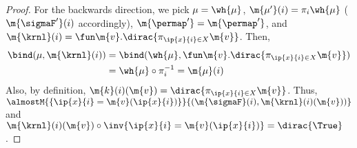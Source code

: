 \begin{proof}
	For the backwards direction,
	we pick $\mu = \wh{\mu}$,
  $\m{\mu'}(i) = \pi_{i}\wh{\mu}$ ($\m{\sigmaF'}(i)$ accordingly),
  $\m{\permap'}=\m{\permap'}$,
	and $\m{\krnl}(i) = \fun \m{v}. \dirac{\pi_{\ip{x}{i} \in X} \m{v}}$.
Then,
\begin{align*}
		\bind(\mu, \m{\krnl}(i))
		&= \bind(\wh{\mu}, \fun \m{v}. \dirac{\pi_{\ip{x}{i} \in X} \m{v}})\\
		&= \wh{\mu} \circ \pi_i^{-1} = \m{\mu}(i)
	\end{align*}
Also, by definition,
	$\m{k}(i)(\m{v}) = \dirac{\pi_{\ip{x}{i} \in X} \m{v}}$.
Thus,
  $\almostM{\{\ip{x}{i} = \m{v}(\ip{x}{i})\}}{(\m{\sigmaF}(i), \m{\krnl}(i)(\m{v}))}$ and
  $\m{\krnl}(i)(\m{v}) \circ \inv{\ip{x}{i} = \m{v}(\ip{x}{i})} = \dirac{\True}$.
\end{proof}

